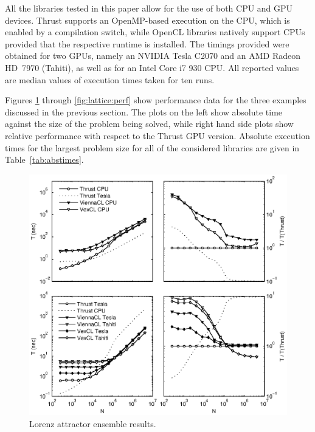 \documentclass[final]{siamltex}
\begin{document}
All the libraries tested in this paper allow for the use of both CPU and
GPU devices.  Thrust supports an OpenMP-based execution on the CPU, which is enabled
by a compilation switch, while OpenCL libraries natively support CPUs provided that the respective runtime is installed.
The timings provided were obtained for two GPUs, namely an NVIDIA Tesla C2070 and
an AMD Radeon HD~7970 (Tahiti), as well as for an Intel Core i7 930 CPU.
All reported values are median values of execution times taken for ten runs.



Figures \ref{fig:lorenz:perf} through \ref{fig:lattice:perf} show performance
data for the three examples discussed in the previous section.
The plots on the left show absolute time against the size of the problem being solved, while right hand side plots   %
show relative performance with respect to the Thrust GPU version.
Absolute execution times for the largest
problem size for all of the considered libraries are given in Table~\ref{tab:abstimes}.

\begin{figure}
    \begin{center}
      \includegraphics[width=\textwidth]{data/lorenz_ensemble/perfmtx}
    \end{center}
    \caption{Lorenz attractor ensemble results.}
    \label{fig:lorenz:perf}
\end{figure}
\end{document}
